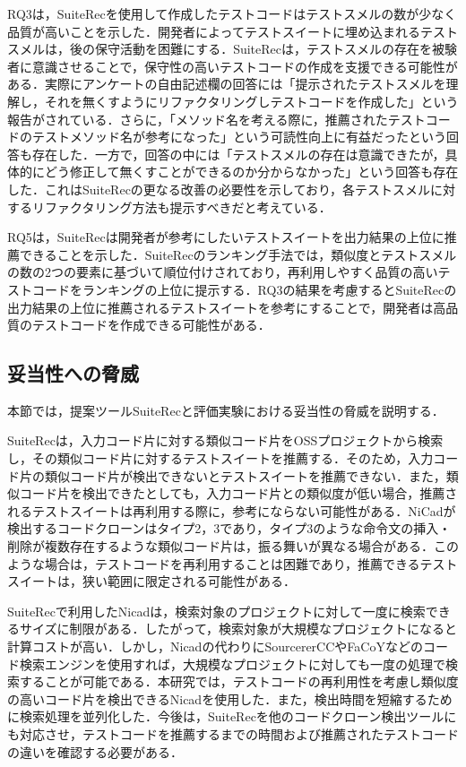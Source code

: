 \documentclass[12pt]{jarticle} %
\begin{document}
RQ3は，{\sf SuiteRec}を使用して作成したテストコードはテストスメルの数が少なく品質が高いことを示した．開発者によってテストスイートに埋め込まれるテストスメルは，後の保守活動を困難にする．{\sf SuiteRec}は，テストスメルの存在を被験者に意識させることで，保守性の高いテストコードの作成を支援できる可能性がある．実際にアンケートの自由記述欄の回答には「提示されたテストスメルを理解し，それを無くすようにリファクタリングしテストコードを作成した」という報告がされている．さらに，「メソッド名を考える際に，推薦されたテストコードのテストメソッド名が参考になった」という可読性向上に有益だったという回答も存在した．一方で，回答の中には「テストスメルの存在は意識できたが，具体的にどう修正して無くすことができるのか分からなかった」という回答も存在した．これは{\sf SuiteRec}の更なる改善の必要性を示しており，各テストスメルに対するリファクタリング方法も提示すべきだと考えている．

RQ5は，{\sf SuiteRec}は開発者が参考にしたいテストスイートを出力結果の上位に推薦できることを示した．{\sf SuiteRec}のランキング手法では，類似度とテストスメルの数の2つの要素に基づいて順位付けされており，再利用しやすく品質の高いテストコードをランキングの上位に提示する．RQ3の結果を考慮すると{\sf SuiteRec}の出力結果の上位に推薦されるテストスイートを参考にすることで，開発者は高品質のテストコードを作成できる可能性がある．

\subsection{妥当性への脅威}

本節では，提案ツール{\sf SuiteRec}と評価実験における妥当性の脅威を説明する．

{\sf SuiteRec}は，入力コード片に対する類似コード片をOSSプロジェクトから検索し，その類似コード片に対するテストスイートを推薦する．そのため，入力コード片の類似コード片が検出できないとテストスイートを推薦できない．また，類似コード片を検出できたとしても，入力コード片との類似度が低い場合，推薦されるテストスイートは再利用する際に，参考にならない可能性がある．{\sf NiCad}が検出するコードクローンはタイプ2，3であり，タイプ3のような命令文の挿入・削除が複数存在するような類似コード片は，振る舞いが異なる場合がある．このような場合は，テストコードを再利用することは困難であり，推薦できるテストスイートは，狭い範囲に限定される可能性がある．

{\sf SuiteRec}で利用した{\sf Nicad}は，検索対象のプロジェクトに対して一度に検索できるサイズに制限がある．したがって，検索対象が大規模なプロジェクトになると計算コストが高い．しかし，{\sf Nicad}の代わりに{\sf SourcererCC}\cite{SourcererCC}や{\sf FaCoY}\cite{FaCoY}などのコード検索エンジンを使用すれば，大規模なプロジェクトに対しても一度の処理で検索することが可能である．本研究では，テストコードの再利用性を考慮し類似度の高いコード片を検出できる{\sf Nicad}を使用した．また，検出時間を短縮するために検索処理を並列化した．今後は，{\sf SuiteRec}を他のコードクローン検出ツールにも対応させ，テストコードを推薦するまでの時間および推薦されたテストコードの違いを確認する必要がある．
\end{document}
